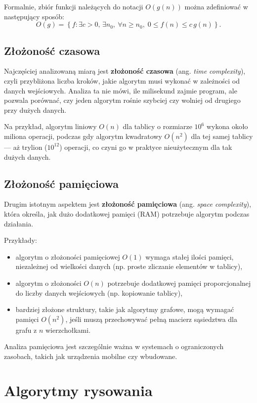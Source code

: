 \documentclass[a4paper,12pt]{book} %
\begin{document}
Formalnie, zbiór funkcji należących do notacji \(O(g(n))\) można zdefiniować w następujący sposób:
\[
O(g) = \left\{ f : \exists c>0,\,\exists n_0,\ \forall n \ge n_0,\; 0 \le f(n) \le c\,g(n) \right\}.
\]

\subsection*{Złożoność czasowa}

Najczęściej analizowaną miarą jest \textbf{złożoność czasowa} (ang. \textit{time complexity}), czyli przybliżona liczba kroków, jakie algorytm musi wykonać w zależności od danych wejściowych. Analiza ta nie mówi, ile milisekund zajmie program, ale pozwala porównać, czy jeden algorytm rośnie szybciej czy wolniej od drugiego przy dużych danych. 

Na przykład, algorytm liniowy \(O(n)\) dla tablicy o rozmiarze \(10^6\) wykona około miliona operacji, podczas gdy algorytm kwadratowy \(O(n^2)\) dla tej samej tablicy — aż trylion (\(10^{12}\)) operacji, co czyni go w praktyce nieużytecznym dla tak dużych danych.

\subsection*{Złożoność pamięciowa}

Drugim istotnym aspektem jest \textbf{złożoność pamięciowa} (ang. \textit{space complexity}), która określa, jak dużo dodatkowej pamięci (RAM) potrzebuje algorytm podczas działania. 

Przykłady:
\begin{itemize}
    \item algorytm o złożoności pamięciowej \(O(1)\) wymaga stałej ilości pamięci, niezależnej od wielkości danych (np. proste zliczanie elementów w tablicy),
    \item algorytm o złożoności \(O(n)\) potrzebuje dodatkowej pamięci proporcjonalnej do liczby danych wejściowych (np. kopiowanie tablicy),
    \item bardziej złożone struktury, takie jak algorytmy grafowe, mogą wymagać pamięci \(O(n^2)\), jeśli muszą przechowywać pełną macierz sąsiedztwa dla grafu z \(n\) wierzchołkami.
\end{itemize}

Analiza pamięciowa jest szczególnie ważna w systemach o ograniczonych zasobach, takich jak urządzenia mobilne czy wbudowane.

\section{Algorytmy rysowania}
\end{document}

